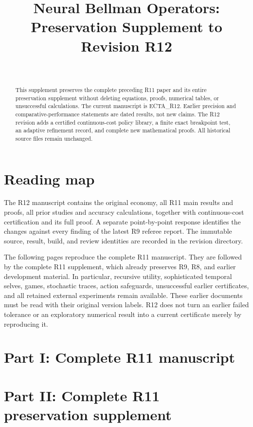 \documentclass[ecta]{econsocart}
\begin{document}
\begin{frontmatter}
\title{Neural Bellman Operators: Preservation Supplement to Revision R12}
\begin{aug}
\author[id=au1,addressref={add1}]{~}
\address[id=add1]{}
\end{aug}
\begin{abstract}
This supplement preserves the complete preceding R11 paper and its entire preservation supplement without deleting equations, proofs, numerical tables, or unsuccessful calculations. The current manuscript is ECTA\_R12. Earlier precision and comparative-performance statements are dated results, not new claims. The R12 revision adds a certified continuous-cost policy library, a finite exact breakpoint test, an adaptive refinement record, and complete new mathematical proofs. All historical source files remain unchanged.
\end{abstract}
\end{frontmatter}
\section*{Reading map}
The R12 manuscript contains the original economy, all R11 main results and proofs, all prior studies and accuracy calculations, together with continuous-cost certification and its full proof. A separate point-by-point response identifies the changes against every finding of the latest R9 referee report. The immutable source, result, build, and review identities are recorded in the revision directory.

The following pages reproduce the complete R11 manuscript. They are followed by the complete R11 supplement, which already preserves R9, R8, and earlier development material. In particular, recursive utility, sophisticated temporal selves, games, stochastic traces, action safeguards, unsuccessful earlier certificates, and all retained external experiments remain available. These earlier documents must be read with their original version labels. R12 does not turn an earlier failed tolerance or an exploratory numerical result into a current certificate merely by reproducing it.

\section*{Part I: Complete R11 manuscript}

\section*{Part II: Complete R11 preservation supplement}

\end{document}
